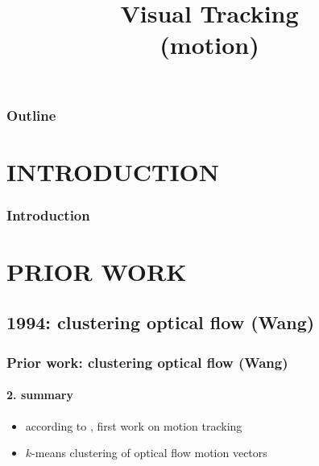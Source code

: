 
\title{Visual Tracking \\ (motion)}
\begin{frame}[plain]\logoTechTower
	\titlepage
\end{frame}

\begin{frame}
\frametitle{Outline}
\logoCSIPCPL\logoTechTower
	\setcounter{tocdepth}{1}	
	\tableofcontents
\end{frame}

\section{INTRODUCTION}
\begin{frame}
\frametitle{Introduction}
\framesubtitle{}
\logoCSIPCPL\mypagenum
\end{frame}

\section{PRIOR WORK}
\subsection{1994: clustering optical flow (Wang)}
\begin{frame}
\frametitle{Prior work: clustering optical flow (Wang)}
\framesubtitle{2. summary}
\mypagenum
{}
	\begin{itemize}
		\item according to , first work on motion tracking
		\item $k$-means clustering of optical flow motion vectors
	\end{itemize}
\end{frame}


